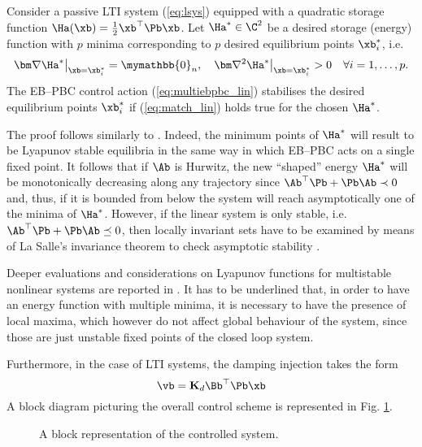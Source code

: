 %
\begin{prop}
	Consider a passive LTI system (\ref{eq:lsys}) equipped with a quadratic storage function $\Ha(\xb) = \frac{1}{2}\xb^\top \Pb\xb$. Let $\Ha^*\in\C^2$ be a desired storage (energy) function with $p$ minima corresponding to $p$ desired equilibrium points $\xb^*_i$, i.e.
	\begin{equation}
	\bm\nabla\Ha^*\big|_{\xb = \xb^*_i} = \mymathbb{0}_n,~~~ \bm\nabla^2 \Ha^*\big|_{\xb = \xb^*_i}>0\quad\forall i = 1,\dots,p.
	\end{equation}
	The EB--PBC control action (\ref{eq:multiebpbc_lin})
	stabilises the desired equilibrium points $\xb^*_i$ if (\ref{eq:match_lin}) holds true for the chosen $\Ha^*$.
\end{prop}
%
\proof
The proof follows similarly to \citep{ortega2008control}. Indeed, the minimum points of $\Ha^*$ will result to be Lyapunov stable equilibria in the same way in which EB--PBC acts on a single fixed point. It follows that if $\Ab$ is Hurwitz, the new ``shaped'' energy $\Ha^*$ will be monotonically decreasing along any trajectory since $\Ab^\top \Pb + \Pb\Ab\prec 0$ and, thus, if it is bounded from below the system will reach asymptotically one of the minima of $\Ha^*$. However, if the linear system is only stable, i.e. $\Ab^\top \Pb + \Pb\Ab\preceq 0$, then locally invariant sets have to be examined by means of La Salle’s invariance theorem to check asymptotic stability \citep{khalil2002nonlinear}.
\endproof
%
\begin{rem}
	Deeper evaluations and considerations on Lyapunov functions for multistable nonlinear systems are reported in \cite{efimov2012global}. It has to be underlined that, in order to have an energy function with multiple minima, it is necessary to have the presence of local maxima, which however do not affect global behaviour of the system, since those are just unstable fixed points of the closed loop system.
	
\end{rem}
%
Furthermore, in the case of LTI systems, the damping injection takes the form
\begin{equation}
    \vb = \mathbf{K}_d\Bb^\top\Pb\xb
\end{equation}
A block diagram  picturing the overall control scheme is represented in Fig. \ref{fig:block}.
%
\begin{figure}[!h]
	\centering
	\caption{A block representation of the controlled system.}
	\label{fig:block}
\end{figure}
%
